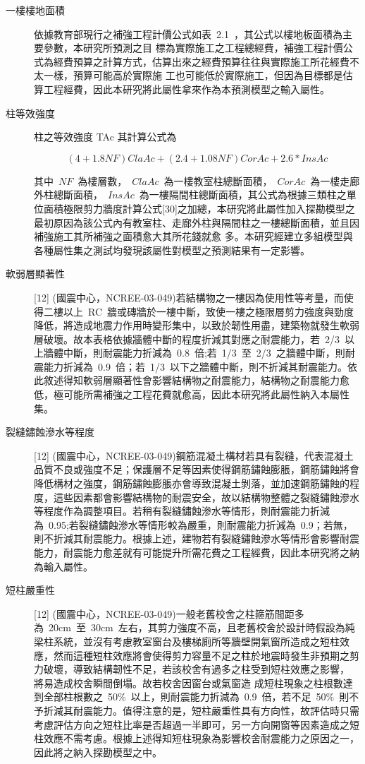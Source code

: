 \begin{description}
  \item[一樓樓地面積]
  依據教育部現行之補強工程計價公式如表~2.1~，其公式以樓地板面積為主要參數，本研究所預測之目 標為實際施工之工程總經費，補強工程計價公式為經費預算之計算方式，估算出來之經費預算往往與實際施工所花經費不太一樣，預算可能高於實際施 工也可能低於實際施工，但因為目標都是估算工程經費，因此本研究將此屬性拿來作為本預測模型之輸入屬性。
  \item[柱等效強度]
  柱之等效強度 TAc 其計算公式為

  \begin{equation}(4+1.8NF)ClaAc+(2.4+1.08NF)CorAc+2.6*InsAc\end{equation} 

  其中~$NF$~為樓層數，~$ClaAc$~為一樓教室柱總斷面積，~$CorAc$~為一樓走廊外柱總斷面積，~$InsAc$~為一樓隔間柱總斷面積，其公式為根據三類柱之單位面積極限剪力牆度計算公式[30]之加總，本研究將此屬性加入探勘模型之最初原因為該公式內有教室柱、走廊外柱與隔間柱之一樓總斷面積，並且因補強施工其所補強之面積愈大其所花錢就愈 多。本研究經建立多組模型與各種屬性集之測試均發現該屬性對模型之預測結果有一定影響。
  \item[軟弱層顯著性]
  [12] (國震中心，NCREE-03-049)若結構物之一樓因為使用性等考量，而使得二樓以上~RC~牆或磚牆於一樓中斷，致使一樓之極限層剪力強度與勁度降低，將造成地震力作用時變形集中，以致於韌性用盡，建築物就發生軟弱層破壞。故本表格依據牆體中斷的程度折減其對應之耐震能力，若~2/3~以上牆體中斷，則耐震能力折減為~0.8~倍;若~1/3~至~2/3~之牆體中斷，則耐震能力折減為~0.9~倍；若~1/3~以下之牆體中斷，則不折減其耐震能力。依此敘述得知軟弱層顯著性會影響結構物之耐震能力，結構物之耐震能力愈低，極可能所需補強之工程花費就愈高，因此本研究將此屬性納入本屬性集。
  \item[裂縫鏽蝕滲水等程度]
  [12] (國震中心，NCREE-03-049)鋼筋混凝土構材若具有裂縫，代表混凝土品質不良或強度不足；保護層不足等因素使得鋼筋鏽蝕膨脹，鋼筋鏽蝕將會降低構材之強度，鋼筋鏽蝕膨脹亦會導致混凝土剝落，並加速鋼筋鏽蝕的程度，這些因素都會影響結構物的耐震安全，故以結構物整體之裂縫鏽蝕滲水等程度作為調整項目。若稍有裂縫鏽蝕滲水等情形，則耐震能力折減為~0.95;若裂縫鏽蝕滲水等情形較為嚴重，則耐震能力折減為~0.9；若無，則不折減其耐震能力。根據上述，建物若有裂縫鏽蝕滲水等情形會影響耐震能力，耐震能力愈差就有可能提升所需花費之工程經費，因此本研究將之納為輸入屬性。
  \item[短柱嚴重性]
  [12] (國震中心，NCREE-03-049)一般老舊校舍之柱箍筋間距多為~20cm~至~30cm~左右，其剪力強度不高，且老舊校舍於設計時假設為純梁柱系統，並沒有考慮教室窗台及樓梯廁所等牆壁開氣窗所造成之短柱效應，然而這種短柱效應將會使得剪力容量不足之柱於地震時發生非預期之剪力破壞，導致結構韌性不足，若該校舍有過多之柱受到短柱效應之影響， 將易造成校舍瞬間倒塌。故若校舍因窗台或氣窗造 成短柱現象之柱根數達到全部柱根數之~50\%~以上，則耐震能力折減為~0.9~倍，若不足~50\%~則不予折減其耐震能力。值得注意的是，短柱嚴重性具有方向性，故評估時只需考慮評估方向之短柱比率是否超過一半即可，另一方向開窗等因素造成之短柱效應不需考慮。根據上述得知短柱現象為影響校舍耐震能力之原因之一，因此將之納入探勘模型之中。

\end{description}
